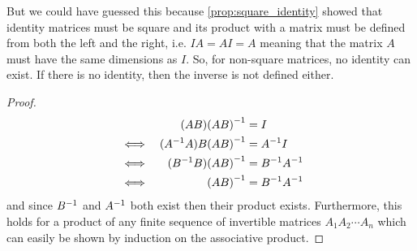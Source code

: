 \documentclass[MathsNotesBase.tex]{subfiles}
\begin{document}
{		But we could have guessed this because \autoref{prop:square_identity} showed that identity matrices must be square and its product with a matrix must be defined from both the left and the right, i.e. $IA = AI = A$ meaning that the matrix $A$ must have the same dimensions as $I$. So, for non-square matrices, no identity can exist. If there is no identity, then the inverse is not defined either.
		
		\begin{proof}
		\begin{align*}
		& 	  &	(AB){(AB)}^{-1} &= I \\
		&\iff &	({A}^{-1}A)B{(AB)}^{-1} &= {A}^{-1}I \\
		&\iff &	({B}^{-1}B){(AB)}^{-1} &= {B}^{-1}{A}^{-1} \\
		&\iff &	{(AB)}^{-1} &= {B}^{-1}{A}^{-1} \\
		\end{align*}
		and since ${B}^{-1}$ and ${A}^{-1}$ both exist then their product exists.
		Furthermore, this holds for a product of any finite sequence of invertible matrices $A_1A_2\cdots A_n$ which can easily be shown by induction on the associative product.
		\end{proof}
	}
	
\end{document}
